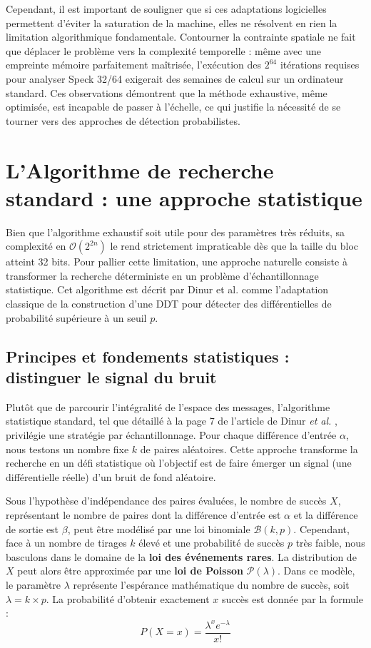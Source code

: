 \documentclass[a4paper,11pt]{article}
\begin{document}
Cependant, il est important de souligner que si ces adaptations logicielles permettent d'éviter la saturation de la machine, elles ne résolvent en rien la limitation algorithmique fondamentale. Contourner la contrainte spatiale ne fait que déplacer le problème vers la complexité temporelle : même avec une empreinte mémoire parfaitement maîtrisée, l'exécution des $2^{64}$ itérations requises pour analyser Speck 32/64 exigerait des semaines de calcul sur un ordinateur standard. Ces observations démontrent que la méthode exhaustive, même optimisée, est incapable de passer à l'échelle, ce qui justifie la nécessité de se tourner vers des approches de détection probabilistes.

\section{L'Algorithme de recherche standard : une approche statistique}

Bien que l'algorithme exhaustif soit utile pour des paramètres très réduits, sa complexité en $\mathcal{O}(2^{2n})$ le rend strictement impraticable dès que la taille du bloc atteint 32 bits. Pour pallier cette limitation, une approche naturelle consiste à transformer la recherche déterministe en un problème d'échantillonnage statistique. Cet algorithme est décrit par Dinur et al. \cite{DDKRS23} comme l'adaptation classique de la construction d'une DDT pour détecter des différentielles de probabilité supérieure à un seuil $p$.

\subsection{Principes et fondements statistiques : distinguer le signal du bruit}

Plutôt que de parcourir l'intégralité de l'espace des messages, l'algorithme statistique standard, tel que détaillé à la page 7 de l'article de Dinur \textit{et al.} \cite{DDKRS23}, privilégie une stratégie par échantillonnage. Pour chaque différence d'entrée $\alpha$, nous testons un nombre fixe $k$ de paires aléatoires. Cette approche transforme la recherche en un défi statistique où l'objectif est de faire émerger un \og signal \fg{} (une différentielle réelle) d'un \og bruit \fg{} de fond aléatoire.

\vspace{0.5cm}

Sous l'hypothèse d'indépendance des paires évaluées, le nombre de succès $X$, représentant le nombre de paires dont la différence d'entrée est $\alpha$ et la différence de sortie est $\beta$, peut être modélisé par une loi binomiale $\mathcal{B}(k, p)$. Cependant, face à un nombre de tirages $k$ élevé et une probabilité de succès $p$ très faible, nous basculons dans le domaine de la \textbf{loi des événements rares}. La distribution de $X$ peut alors être approximée par une \textbf{loi de Poisson} $\mathcal{P}(\lambda)$. Dans ce modèle, le paramètre $\lambda$ représente l'espérance mathématique du nombre de succès, soit $\lambda = k \times p$. La probabilité d'obtenir exactement $x$ succès est donnée par la formule :
$$P(X = x) = \frac{\lambda^x e^{-\lambda}}{x!}$$
\end{document}
